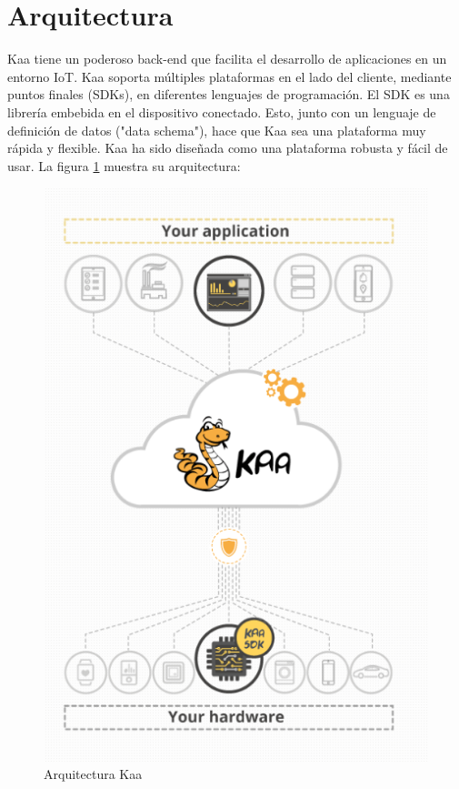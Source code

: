 \documentclass[12pt, twoside]{book}
\begin{document}
\section{Arquitectura}
Kaa tiene un poderoso back-end que facilita el desarrollo de aplicaciones en un entorno IoT. Kaa soporta múltiples plataformas en el lado del cliente, mediante puntos finales (SDKs), en diferentes lenguajes de programación. El SDK es una librería embebida en el dispositivo conectado. Esto, junto con un lenguaje de definición de datos ("data schema"), hace que Kaa sea una plataforma muy rápida y flexible. Kaa ha sido diseñada como una plataforma robusta y fácil de usar. La figura \ref{L501} muestra su arquitectura:
\begin{figure}[H]
\centering
\includegraphics[scale=0.4]{images/kaa_platform}
\caption{Arquitectura Kaa}\label{L501}
\end{figure}
\end{document}
